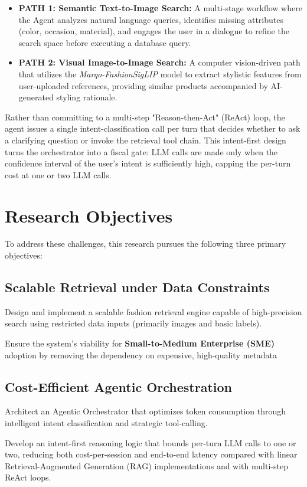 \begin{itemize}
    \item \textbf{PATH 1: Semantic Text-to-Image Search:} A multi-stage workflow where the Agent analyzes natural language queries, identifies missing attributes (color, occasion, material), and engages the user in a dialogue to refine the search space before executing a database query.
    \item \textbf{PATH 2: Visual Image-to-Image Search:} A computer vision-driven path that utilizes the \textit{Marqo-FashionSigLIP} model to extract stylistic features from user-uploaded references, providing similar products accompanied by AI-generated styling rationale.
\end{itemize}

Rather than committing to a multi-step "Reason-then-Act" (ReAct) loop, the agent issues a single intent-classification call per turn that decides whether to ask a clarifying question or invoke the retrieval tool chain. This intent-first design turns the orchestrator into a fiscal gate: LLM calls are made only when the confidence interval of the user's intent is sufficiently high, capping the per-turn cost at one or two LLM calls.

\section{Research Objectives}
To address these challenges, this research pursues the following three primary objectives:
\subsection{Scalable Retrieval under Data Constraints}
Design and implement a scalable fashion retrieval engine capable of high-precision search using restricted data inputs (primarily images and basic labels).

Ensure the system's viability for \textbf{Small-to-Medium Enterprise (SME)} adoption by removing the dependency on expensive, high-quality metadata

\subsection{Cost-Efficient Agentic Orchestration}

Architect an Agentic Orchestrator that optimizes token consumption through intelligent intent classification and strategic tool-calling.

Develop an intent-first reasoning logic that bounds per-turn LLM calls to one or two, reducing both cost-per-session and end-to-end latency compared with linear Retrieval-Augmented Generation (RAG) implementations and with multi-step ReAct loops.

